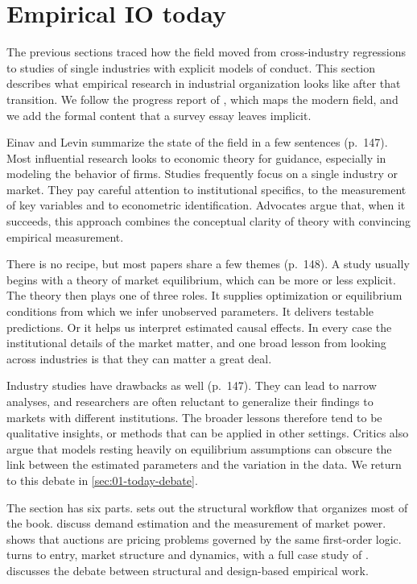 \section{Empirical IO today}\label{sec:01-today}

The previous sections traced how the field moved from cross-industry regressions to studies of single
industries with explicit models of conduct. This section describes what empirical research in industrial
organization looks like after that transition. We follow the progress report of \citet{EinavLevin2010},
which maps the modern field, and we add the formal content that a survey essay leaves implicit.

Einav and Levin summarize the state of the field in a few sentences (p.~147). Most influential research
looks to economic theory for guidance, especially in modeling the behavior of firms. Studies frequently
focus on a single industry or market. They pay careful attention to institutional specifics, to the
measurement of key variables and to econometric identification. Advocates argue that, when it succeeds,
this approach combines the conceptual clarity of theory with convincing empirical measurement.

There is no recipe, but most papers share a few themes (p.~148). A study usually begins with a theory of
market equilibrium, which can be more or less explicit. The theory then plays one of three roles. It
supplies optimization or equilibrium conditions from which we infer unobserved parameters. It delivers
testable predictions. Or it helps us interpret estimated causal effects. In every case the institutional
details of the market matter, and one broad lesson from looking across industries is that they can matter
a great deal.

Industry studies have drawbacks as well (p.~147). They can lead to narrow analyses, and researchers are
often reluctant to generalize their findings to markets with different institutions. The broader lessons
therefore tend to be qualitative insights, or methods that can be applied in other settings. Critics also
argue that models resting heavily on equilibrium assumptions can obscure the link between the estimated
parameters and the variation in the data. We return to this debate in \cref{sec:01-today-debate}.

The section has six parts.  sets out the structural workflow that organizes most of
the book.  discuss demand estimation and the measurement of
market power.  shows that auctions are pricing problems governed by the same
first-order logic.  turns to entry, market structure and dynamics, with a
full case study of \citet{BresnahanReiss1991}.  discusses the debate
between structural and design-based empirical work.

